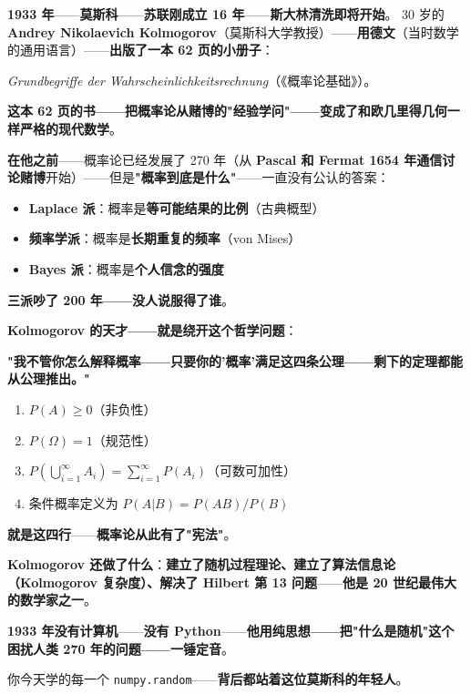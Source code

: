 \begin{tcolorbox}[storybox={\Large 小故事：Kolmogorov 与 1933 年的公理化}]
\textbf{1933 年}——\textbf{莫斯科}——\textbf{苏联刚成立 16 年}——\textbf{斯大林清洗即将开始}。
30 岁的 \textbf{Andrey Nikolaevich Kolmogorov}（莫斯科大学教授）——\textbf{用德文}（当时数学的通用语言）——\textbf{出版了一本 62 页的小册子}：

\smallskip

\textit{Grundbegriffe der Wahrscheinlichkeitsrechnung}（《概率论基础》）。

\medskip

\textbf{这本 62 页的书——把概率论从赌博的"经验学问"——变成了和欧几里得几何一样严格的现代数学}。

\medskip

\textbf{在他之前}——概率论已经发展了 270 年（从 \textbf{Pascal 和 Fermat 1654 年通信讨论赌博}开始）——但是\textbf{"概率到底是什么"}——一直没有公认的答案：

\begin{itemize}
\item \textbf{Laplace 派}：概率是\textbf{等可能结果的比例}（古典概型）
\item \textbf{频率学派}：概率是\textbf{长期重复的频率}（von Mises）
\item \textbf{Bayes 派}：概率是\textbf{个人信念的强度}
\end{itemize}

\textbf{三派吵了 200 年——没人说服得了谁}。

\medskip

\textbf{Kolmogorov 的天才——就是绕开这个哲学问题}：

\textbf{"我不管你怎么解释概率——只要你的'概率'满足这四条公理——剩下的定理都能从公理推出。"}

\begin{enumerate}
\item $P(A) \geq 0$（非负性）
\item $P(\Omega) = 1$（规范性）
\item $P\left(\bigcup_{i=1}^\infty A_i\right) = \sum_{i=1}^\infty P(A_i)$（可数可加性）
\item 条件概率定义为 $P(A|B) = P(AB)/P(B)$
\end{enumerate}

\medskip

\textbf{就是这四行}——\textbf{概率论从此有了"宪法"}。

\textbf{Kolmogorov 还做了什么}：\textbf{建立了随机过程理论、建立了算法信息论（Kolmogorov 复杂度）、解决了 Hilbert 第 13 问题}——\textbf{他是 20 世纪最伟大的数学家之一}。

\medskip

\textbf{1933 年没有计算机}——\textbf{没有 Python}——\textbf{他用纯思想——把"什么是随机"这个困扰人类 270 年的问题——一锤定音}。

\medskip

你今天学的每一个 \texttt{numpy.random}——\textbf{背后都站着这位莫斯科的年轻人}。
\end{tcolorbox}

